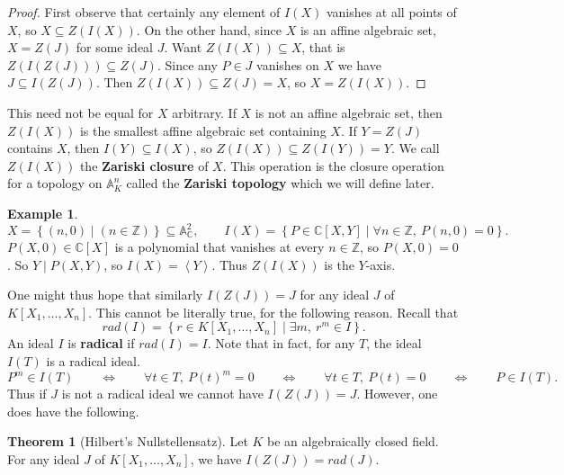 \documentclass{article}
\newcommand{\Z}{\mathbb{Z}}
\newcommand{\C}{\mathbb{C}}
\newcommand{\A}{\mathbb{A}}
\newcommand{\rb}[1]{\left( #1 \right)}
\renewcommand{\sb}[1]{\left[ #1 \right]}
\newcommand{\cb}[1]{\left\{ #1 \right\}}
\newcommand{\ab}[1]{\left\langle #1 \right\rangle}
\theoremstyle{definition}\newtheorem{definition}{Definition}[subsection]
\theoremstyle{definition}\newtheorem{remark}[definition]{Remark}
\theoremstyle{definition}\newtheorem*{example}{Example}
\theoremstyle{definition}\newtheorem*{note}{Note}
\newtheorem{theorem}[definition]{Theorem}
\begin{document}
\begin{proof}
First observe that certainly any element of $ I\rb{X} $ vanishes at all points of $ X $, so $ X \subseteq Z\rb{I\rb{X}} $. On the other hand, since $ X $ is an affine algebraic set, $ X = Z\rb{J} $ for some ideal $ J $. Want $ Z\rb{I\rb{X}} \subseteq X $, that is $ Z\rb{I\rb{Z\rb{J}}} \subseteq Z\rb{J} $. Since any $ P \in J $ vanishes on $ X $ we have $ J \subseteq I\rb{Z\rb{J}} $. Then $ Z\rb{I\rb{X}} \subseteq Z\rb{J} = X $, so $ X = Z\rb{I\rb{X}} $.
\end{proof}

This need not be equal for $ X $ arbitrary. If $ X $ is not an affine algebraic set, then $ Z\rb{I\rb{X}} $ is the smallest affine algebraic set containing $ X $. If $ Y = Z\rb{J} $ contains $ X $, then $ I\rb{Y} \subseteq I\rb{X} $, so $ Z\rb{I\rb{X}} \subseteq Z\rb{I\rb{Y}} = Y $. We call $ Z\rb{I\rb{X}} $ the \textbf{Zariski closure} of $ X $. This operation is the closure operation for a topology on $ \A_K^n $ called the \textbf{Zariski topology} which we will define later.

\begin{example}
$$ X = \cb{\rb{n, 0} \mid \rb{n \in \Z}} \subseteq \A_\C^2, \qquad I\rb{X} = \cb{P \in \C\sb{X, Y} \mid \forall n \in \Z, \ P\rb{n, 0} = 0}. $$
$ P\rb{X, 0} \in \C\sb{X} $ is a polynomial that vanishes at every $ n \in \Z $, so $ P\rb{X, 0} = 0 $. So $ Y \mid P\rb{X, Y} $, so $ I\rb{X} = \ab{Y} $. Thus $ Z\rb{I\rb{X}} $ is the $ Y $-axis.
\end{example}

One might thus hope that similarly $ I\rb{Z\rb{J}} = J $ for any ideal $ J $ of $ K\sb{X_1, \dots, X_n} $. This cannot be literally true, for the following reason. Recall that
$$ rad\rb{I} = \cb{r \in K\sb{X_1, \dots, X_n} \mid \exists m, \ r^m \in I}. $$
An ideal $ I $ is \textbf{radical} if $ rad\rb{I} = I $. Note that in fact, for any $ T $, the ideal $ I\rb{T} $ is a radical ideal.
$$ P^m \in I\rb{T} \qquad \iff \qquad \forall t \in T, \ P\rb{t}^m = 0 \qquad \iff \qquad \forall t \in T, \ P\rb{t} = 0 \qquad \iff \qquad P \in I\rb{T}. $$
Thus if $ J $ is not a radical ideal we cannot have $ I\rb{Z\rb{J}} = J $. However, one does have the following.

\begin{theorem}[Hilbert's Nullstellensatz]
\label{thm:13.2.4}
Let $ K $ be an algebraically closed field. For any ideal $ J $ of $ K\sb{X_1, \dots, X_n} $, we have $ I\rb{Z\rb{J}} = rad\rb{J} $.
\end{theorem}
\end{document}
